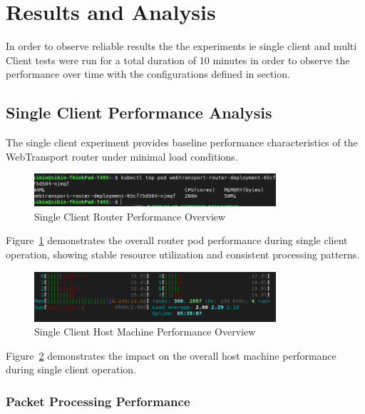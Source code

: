 \section{Results and Analysis}
In order to observe reliable results the the experiments ie single client and multi Client tests were run for a total duration of 10 minutes in order to observe the performance over time with the configurations defined in section.

\subsection{Single Client Performance Analysis}

The single client experiment provides baseline performance characteristics of the WebTransport router under minimal load conditions.
\begin{figure}[h!]
\centering
\includegraphics[width=0.8\textwidth]{Evaluation/new-single-client-stats.png}
\caption{Single Client Router Performance Overview}
\label{fig:single-client-overview}
\end{figure}

Figure~\ref{fig:single-client-overview} demonstrates the overall router pod performance during single client operation, showing stable resource utilization and consistent processing patterns.

\begin{figure}[h!]
\centering
\includegraphics[width=0.8\textwidth]{Evaluation/single-client-host-stats.png}
\caption{Single Client Host Machine Performance Overview}
\label{fig:single-client-host-overview}
\end{figure}
Figure~\ref{fig:single-client-host-overview} demonstrates the impact on the overall host machine performance during single client operation.



\subsubsection{Packet Processing Performance}

